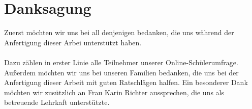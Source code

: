  
\vspace*{5cm}
\section*{Danksagung}
\vspace{1.7cm}
Zuerst möchten wir uns bei all denjenigen bedanken, die uns während der Anfertigung dieser Arbei unterstützt haben. \\\\
Dazu zählen in erster Linie alle Teilnehmer unserer Online-Schülerumfrage. Außerdem möchten wir uns bei unseren Familien bedanken, die uns bei der Anfertigung dieser Arbeit mit guten Ratschlägen halfen.
Ein besonderer Dank möchten wir zusützlich an Frau Karin Richter aussprechen, die uns als betreuende Lehrkaft unterstützte.
\newpage
